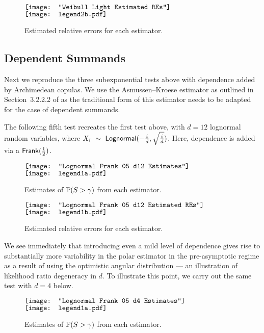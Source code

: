 \begin{figure}[H]
	\centering
	$\vcenter{\hbox{\texttt{[image: "Weibull Light Estimated REs"]}}}$
 	\hspace*{.1in}
 	$\vcenter{\hbox{\texttt{[image: legend2b.pdf]}}}$
	\caption{Estimated relative errors for each estimator.}
\end{figure}

\subsection{Dependent Summands}

Next we reproduce the three subexponential tests above with dependence added by Archimedean copulas. We use the Asmussen--Kroese estimator as outlined in Section~3.2.2.2 of \cite{nandayapa2008risk} as the traditional form of this estimator needs to be adapted for the case of dependent summands.

The following fifth test recreates the first test above, with $d=12$ lognormal random variables, where $X_i~\sim~\mathsf{Lognormal}(-\frac{i}{d}, \sqrt{\frac{i}{d}})$. Here, dependence is added via a $\mathsf{Frank}(\frac{1}{2})$.

\begin{figure}[H]
	\centering
	$\vcenter{\hbox{\texttt{[image: "Lognormal Frank 05 d12 Estimates"]}}}$
 	\hspace*{.1in}
 	$\vcenter{\hbox{\texttt{[image: legend1a.pdf]}}}$
	\caption{Estimates of $\operatorname{{\mathbb P}}(S > \gamma)$ from each estimator.}
\end{figure}

\begin{figure}[H]
	\centering
	$\vcenter{\hbox{\texttt{[image: "Lognormal Frank 05 d12 Estimated REs"]}}}$
 	\hspace*{.1in}
 	$\vcenter{\hbox{\texttt{[image: legend1b.pdf]}}}$
	\caption{Estimated relative errors for each estimator.}
\end{figure}

We see immediately that introducing even a mild level of dependence gives rise to substantially more variability in the polar estimator in the pre-asymptotic regime as
a result of using the optimistic angular distribution --- an illustration of likelihood ratio degeneracy in $d$.
To illustrate this point, we carry out the same test with $d=4$ below.

\begin{figure}[H]
	\centering
	$\vcenter{\hbox{\texttt{[image: "Lognormal Frank 05 d4 Estimates"]}}}$
 	\hspace*{.1in}
 	$\vcenter{\hbox{\texttt{[image: legend1a.pdf]}}}$
	\caption{Estimates of $\operatorname{{\mathbb P}}(S > \gamma)$ from each estimator.}
\end{figure}

